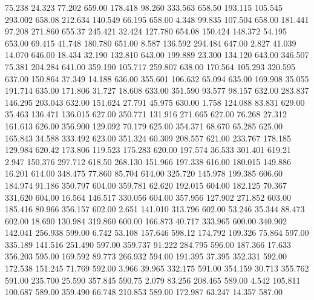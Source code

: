   75.238   24.323   77.202       659.00
 178.418   98.260  333.563       658.50
 193.115  105.545  293.002       658.08
 212.634  140.549   66.195       658.00
   4.348   99.835  107.504       658.00
 181.441   97.208  271.860       655.37
 245.421   32.424  127.780       654.08
 150.424  148.372   54.195       653.00
  69.415   41.748  180.780       651.00
   8.587  136.592  294.484       647.00
   2.827   41.039   14.070       646.00
  18.434   32.190  132.810       643.00
 199.889   23.300  134.120       643.00
 346.507   75.381  204.284       641.00
 359.190  105.717  259.807       638.00
 170.564  105.293  320.595       637.00
 150.864   37.349   14.188       636.00
 355.601  106.632   65.094       635.00
 169.908   35.055  191.714       635.00
 171.806   31.727   18.608       633.00
 351.590   93.577   98.157       632.00
 283.837  146.295  203.043       632.00
 151.624   27.791   45.975       630.00
   1.758  124.088   83.831       629.00
  35.463  136.471  136.015       627.00
 350.771  131.916  271.665       627.00
  76.268   27.312  161.613       626.00
 356.900  129.092   70.179       625.00
 354.371   68.670   65.285       625.00
 165.843   34.588  333.492       623.00
 351.324   60.309  208.557       621.00
 233.767  178.185  129.984       620.42
 173.806  119.523  175.283       620.00
 197.574   36.533  301.401       619.21
   2.947  150.376  297.712       618.50
 268.130  151.966  197.338       616.00
 180.015  149.886   16.201       614.00
 348.475   77.860   85.704       614.00
 325.720  145.978  199.385       606.60
 184.974   91.186  350.797       604.00
 359.781   62.620  192.015       604.00
 182.125   70.367  331.620       604.00
  16.564  146.517  330.056       604.00
 357.956  127.902  271.852       603.00
 185.416   80.966  356.157       602.00
   2.651  141.010  313.796       602.00
  53.246   35.344   88.473       602.00
  18.690  130.984  319.860       600.00
 166.873   40.717  333.965       600.00
 340.902  142.041  256.938       599.00
   6.742   53.108  157.646       598.12
 174.792  109.326   75.864       597.00
 335.189  141.516  251.490       597.00
 359.737   91.222  284.795       596.00
 187.366   17.633  356.203       595.00
 169.592   89.773  266.932       594.00
 191.395   37.395  352.331       592.00
 172.538  151.245   71.769       592.00
   3.966   39.965  332.175       591.00
 354.159   30.713  355.762       591.00
 235.700   25.590  357.845       590.75
   2.079   83.256  208.465       589.00
   4.542  105.811  100.687       589.00
 359.490   66.748  210.853       589.00
 172.987   63.247   14.357       587.00
